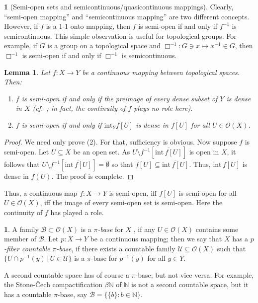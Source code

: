 \documentclass[12pt,final,3p,times]{elsarticle}
\newtheorem{slem}[sthm]{Lemma}
\theoremstyle{definition}
\newtheorem{sse}[sthm]{}
\numberwithin{equation}{section}
\begin{document}
\begin{sse}[Semi-open sets and semicontinuous/quasicontinuous mappings]
Clearly, ``semi-open mapping'' and ``semicontinuous mapping'' are two different concepts. However, if $f$ is a 1-1 onto mapping, then $f$ is semi-open if and only if $f^{-1}$ is semicontinuous. This simple observation is useful for topological groups. For example, if $G$ is a group on a topological space and $\Box^{-1}\colon G\ni x\mapsto x^{-1}\in G$, then $\Box^{-1}$ is semi-open if and only if $\Box^{-1}$ is semicontinuous.
\end{sse}

\begin{slem}\label{P2.2.3}
Let $f\colon X\rightarrow Y$ be a continuous mapping between topological spaces. Then: 
\begin{enumerate}[(1)]
    \item $f$ is semi-open if and only if the preimage of every dense subset of $Y$ is dense in $X$ (cf.~\cite[Lem.~2.1]{G18}; in fact, the continuity of $f$ plays no role here).

    \item $f$ is semi-open if and only if $\mathrm{int}_Yf[U]$ is dense in $f[U]$ for all $U\in\mathscr{O}(X)$.
\end{enumerate}
\end{slem}

\begin{proof}
We need only prove (2). For that, sufficiency is obvious. Now suppose $f$ is semi-open. Let $U\subseteq X$ be an open set. As $U\setminus f^{-1}\left[\overline{\mathrm{int}\,f[U]}\right]$ is open in $X$, it follows that $U\setminus f^{-1}\left[\overline{\mathrm{int}\,f[U]}\right]=\emptyset$ so that $f[U]\subseteq\overline{\mathrm{int}\,f[U]}$. Thus, $\mathrm{int}\,f[U]$ is dense in $f(U)$. The proof is complete.
\end{proof}

Thus, a continuous map $f\colon X\rightarrow Y$ is semi-open, iff $f[U]$ is semi-open for all $U\in\mathscr{O}(X)$, iff the image of every semi-open set is semi-open. Here the continuity of $f$ has played a role.

\begin{sse}\label{2.2.4}
A family $\mathcal{B}\subset\mathscr{O}(X)$ is a \textit{$\pi$-base} for $X$ \cite{O60, W70, M75}, if any $U\in\mathscr{O}(X)$ contains some member of $\mathcal{B}$.
Let $p\colon X\rightarrow Y$ be a continuous mapping; then we say that $X$ has a \textit{$p$-fiber countable $\pi$-base}, if there exists a countable family $\mathcal{U}\subseteq\mathscr{O}(X)$ such that $\{U\cap p^{-1}(y)\,|\,U\in\mathcal{U}\}$ is a $\pi$-base for $p^{-1}(y)$
for all $y\in Y$.
\end{sse}
A second countable space has of course a $\pi$-base; but not vice versa. For example, the Stone-\v{C}ech compactification 
$\beta\mathbb{N}$ of $\mathbb{N}$ is not a second countable space, but it has a countable $\pi$-base, say $\mathcal{B}=\{\{b\}\colon b\in\mathbb{N}\}$.
\end{document}

